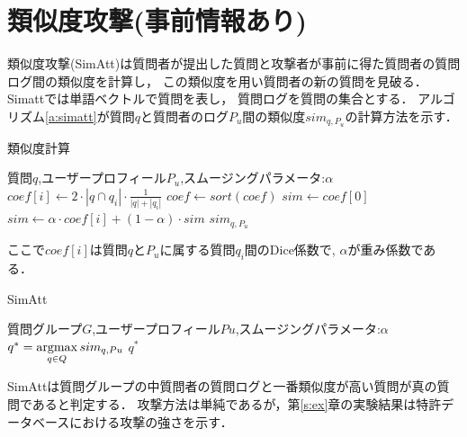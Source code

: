 \documentclass[master]{suribt}
\theoremstyle{definition}
\newcommand{\argmax}{\mathop{\rm argmax}\limits}
\begin{document}
 \section{類似度攻撃(事前情報あり)}
 類似度攻撃(SimAtt)\cite{simattack2016}は質問者が提出した質問と攻撃者が事前に得た質問者の質問ログ間の類似度を計算し，
 この類似度を用い質問者の新の質問を見破る．
 Simattでは単語ベクトルで質問を表し，
 質問ログを質問の集合とする．
 アルゴリズム\ref{a:simatt}が質問$q$と質問者のログ$P_u$間の類似度$sim_{q,P_u}$の計算方法を示す．

 \begin{algorithm}
 \caption{類似度計算}
 \begin{algorithmic}[1]
  \Require 質問$q$,ユーザープロフィール$P_u$,スムージングパラメータ:$\alpha$
  \State $coef[i] \leftarrow 2 \cdot |q \cap q_i| \cdot \frac{1}{|q|+|q_i|}$
  \EndFor
  \State $coef \gets sort(coef)$
  \State $sim \gets coef[0]$
  \State $sim \gets \alpha \cdot coef[i] + (1 - \alpha) \cdot sim$
  \EndFor
  \Ensure $sim_{q,P_u}$
 \end{algorithmic}
 \label{a:simatt}
 \end{algorithm}

 ここで$coef[i]$は質問$q$と$P_u$に属する質問$q_i$間のDice係数\cite{dice1945}で,
 $\alpha$が重み係数である．
  
 \begin{algorithm}
 \caption{SimAtt}
 \begin{algorithmic}[1]
   \Require 質問グループ$G$,ユーザープロフィール$Pu$,スムージングパラメータ:$\alpha$
   \State $q^* = \argmax_{q \in Q}sim_{q,Pu}$
   \Ensure $q^*$
 \end{algorithmic}
 \end{algorithm}

 SimAttは質問グループの中質問者の質問ログと一番類似度が高い質問が真の質問であると判定する．
 攻撃方法は単純であるが，第\ref{s:ex}章の実験結果は特許データベースにおける攻撃の強さを示す．
\end{document}
